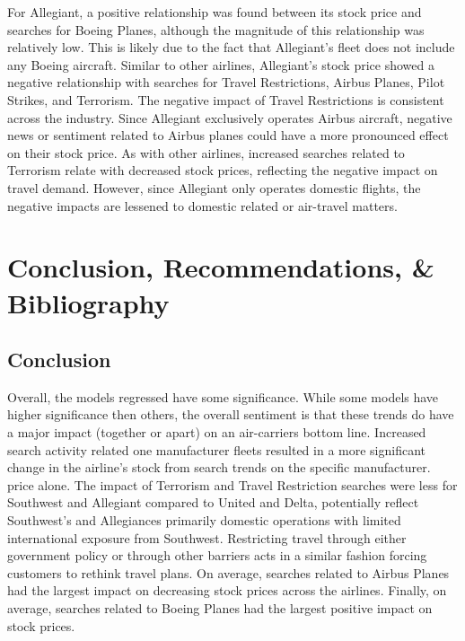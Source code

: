 \documentclass[12pt]{report}
\begin{document}
For Allegiant, a positive relationship was found between its
stock price and searches for Boeing Planes, although the magnitude
of this relationship was relatively low. This is likely due to the fact that
Allegiant's fleet does not include any Boeing aircraft. Similar to other airlines, Allegiant's stock
price showed a negative relationship with searches for Travel
Restrictions, Airbus Planes, Pilot Strikes, and
Terrorism. The negative impact of Travel Restrictions
is consistent across the industry. Since Allegiant exclusively operates Airbus aircraft, negative news or sentiment
related to Airbus planes could have a more pronounced effect on their stock
price. As with other airlines, increased
searches related to Terrorism relate with decreased stock
prices, reflecting the negative impact on travel demand.
However, since Allegiant only operates domestic flights, the negative impacts are lessened to domestic related or air-travel matters.





\newpage







\chapter*{Conclusion, Recommendations, \& Bibliography}
\section*{Conclusion}
Overall, the models regressed have some significance.
While some models have higher significance then others, the overall sentiment is that these trends do have a major impact (together or apart)
on an air-carriers bottom line. Increased search activity related one manufacturer fleets resulted in a more significant change in the airline's stock from search trends on the specific manufacturer.
price alone. The impact of Terrorism and Travel Restriction searches were
less for Southwest and Allegiant compared to United and Delta, potentially
reflect Southwest's and Allegiances primarily domestic operations with limited international
exposure from Southwest. Restricting travel through either government policy or through other barriers acts in a similar fashion forcing customers to rethink travel plans. On average, searches related to Airbus Planes had the largest impact on decreasing stock prices across the airlines.
Finally, on average, searches related to Boeing Planes had the largest positive impact on stock prices.
\end{document}
